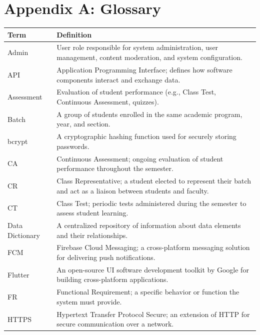 \documentclass[12pt,a4paper]{article}
\newcommand{\THH}[1]{\small\bfseries\color{white} #1}
\begin{document}
\newpage
\section*{Appendix A: Glossary}

\begin{longtable}{|p{3.5cm}|p{10.5cm}|}
\hline
\rowcolor{navyblue}
\THH{Term} & \THH{Definition} \\
\hline
\endhead
Admin & User role responsible for system administration, user management, content moderation, and system configuration. \\
\hline
API & Application Programming Interface; defines how software components interact and exchange data. \\
\hline
Assessment & Evaluation of student performance (e.g., Class Test, Continuous Assessment, quizzes). \\
\hline
Batch & A group of students enrolled in the same academic program, year, and section. \\
\hline
bcrypt & A cryptographic hashing function used for securely storing passwords. \\
\hline
CA & Continuous Assessment; ongoing evaluation of student performance throughout the semester. \\
\hline
CR & Class Representative; a student elected to represent their batch and act as a liaison between students and faculty. \\
\hline
CT & Class Test; periodic tests administered during the semester to assess student learning. \\
\hline
Data Dictionary & A centralized repository of information about data elements and their relationships. \\
\hline
FCM & Firebase Cloud Messaging; a cross-platform messaging solution for delivering push notifications. \\
\hline
Flutter & An open-source UI software development toolkit by Google for building cross-platform applications. \\
\hline
FR & Functional Requirement; a specific behavior or function the system must provide. \\
\hline
HTTPS & Hypertext Transfer Protocol Secure; an extension of HTTP for secure communication over a network. \\

\end{longtable}
\end{document}
